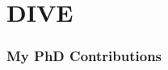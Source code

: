 \documentclass[8pt,xcolor=table]{beamer}
\begin{document}

\section{DIVE}

\begin{frame}
\frametitle{My PhD Contributions}


\begin{figure}
\centering


{ 
\ovEBM 
}
\ovVWDPM

{ 
\ovDKT
\ovTadpole

\ovPainter
}

\end{figure}

\end{frame}
\end{document}
